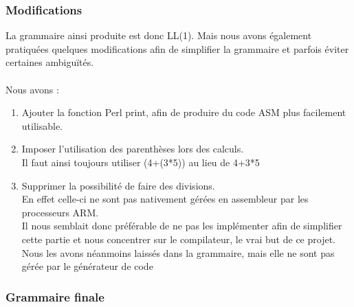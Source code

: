 \documentclass[a4paper,10pt]{article}
\begin{document}
\subsubsection{Modifications}
	La grammaire ainsi produite est donc LL(1).
	Mais nous avons également pratiquées quelques modifications afin de simplifier la grammaire et parfois éviter certaines ambiguïtés.\\
	~\\
	Nous avons : \begin{enumerate}
		\item Ajouter la fonction Perl print, afin de produire du code ASM plus facilement utilisable.
		\item Imposer l'utilisation des parenthèses lors des calculs.\\
			Il faut ainsi toujours utiliser (4+(3*5)) au lieu de 4+3*5
		\item Supprimer la possibilité de faire des divisions.\\
			En effet celle-ci ne sont pas nativement gérées en assembleur par les processeurs ARM.\\
			Il nous semblait donc préférable de ne pas les implémenter afin de simplifier cette partie et nous concentrer sur le compilateur, le vrai but de ce projet. Nous les avons néanmoins laissés dans la grammaire, mais elle ne sont pas gérée par le générateur de code\\	
	\end{enumerate}


\subsubsection{Grammaire finale}
\end{document}
